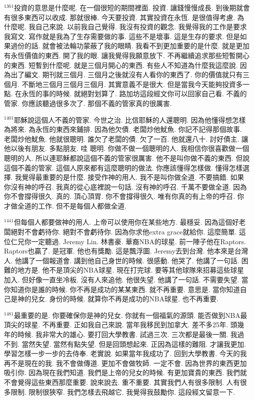 \documentclass{book}
\begin{document}
$^{1361}$投資的意思是什麼呢.
在一個很短的期間裡面.
投資.
讓錢慢慢成長.
到後期就會有很多東西可以收成.
那就很棒.
今天要投資.
其實投資在永恆.
是很值得考慮.
為什麼呢.
我自己來說.
以前我自己覺得.
我沒有投資的觀念.
我覺得我的工作是要求我寫文.
寫作就是我為了生存需要做的事.
這些不是壞事.
這是生存的要求.
但是如果過份的話.
就會被法輪功蒙蔽了我的眼睛.
我看不到更加重要的是什麼.
就是更加有永恆價值的東西.
開了我的眼.
讓我覺得我願意放下.
不再繼續追求那些短暫開心的東西.
短暫到什麼呢.
就是三個月開心的東西.
有些人不知道為什麼我這麼說.
因為出了編文.
期刊就三個月.
三個月之後就沒有人看你的東西了.
你的價值就只有三個月.
不斷地三個月三個月三個月.
其實意義不是很大.
但是當我今天能夠投資多一點.
在永恆的事的時候.
就絕對划算了.
路加坊這段經文你可以回家自己看.
不義的管家.
你應該聽過很多次了.
那個不義的管家真的很厲害.

$^{1401}$耶穌說這個人不義的管家.
今世之治.
比信耶穌的人還聰明.
因為他懂得想怎樣為將來.
為永恆的東西來鋪排.
因為他欠債.
老闆炒他魷魚.
你記不記得那個故事.
老闆炒他魷魚.
他就很聰明.
誰欠了老闆的債.
欠了一百.
他就還八十.
討好債主.
讓他以後有朋友.
多點朋友.
哇 聰明.
你做不做一個聰明的人.
我相信你很喜歡做一個聰明的人.
所以連耶穌都說這個不義的管家很厲害.
他不是叫你做不義的東西.
但說這個不義的管家.
這個人原來都有這麼聰明的做法.
你應該懂得怎樣做.
懂得怎樣選擇.
我覺得最重要的是什麼.
接受作神的用人.
我不是叫你做全道.
不要搞錯.
如果你沒有神的呼召.
我真的從心底裡說一句話.
沒有神的呼召.
千萬不要做全道.
因為你不會撐得很久.
真的.
頂心頂胃.
你不會撐得很久.
唯有你真的有上帝的呼召.
你才做全道的工作.
但不是每個人都做全道.

$^{1441}$但每個人都要做神的用人.
上帝可以使用你在某些地方.
最穩妥.
因為這個好老闆絕對不會虧待你.
絕對不會虧待你.
因為你求他extra grace就給你.
這麼簡單.
這位仁兄你一定聽過.
Jeremy Lin.
林書豪.
華裔NBA的球星.
前一陣子他在Raptors.
Raptors也贏了.
是冠軍.
他也有獎勵.
這是飄浮圖.
Jeremy去到台灣.
他本來是台灣人.
他講了一個報道會.
講到他自己身世的時候.
很感動.
他哭了.
他講了一句話.
困難的地方是.
他不是頂尖的NBA球星.
現在打完球.
要等其他球隊來招募這些球星加入.
但好像一直坐冷板.
沒有人來追他.
他很失望.
他講了一句話.
不需要失望.
當你知道你是誰的時候.
你不再是成功的某某東西.
就不再重要.
意思是.
當你知道自己是神的兒女.
身份的時候.
就算你不再是成功的NBA球星.
也不再重要.

$^{1481}$最重要的是.
你要確保你是神的兒女.
你就有一個福氣的源頭.
能否做到NBA最頂尖的球星.
不再重要.
正如我自己來說.
當年我移民到加拿大.
差不多25年.
頭幾年的時候.
我非常大的雄心.
要打回大學教書.
試過三次.
三次都是最後一關.
我過不到.
當然失望.
當然有點失望.
但是回頭想起來.
正因為這樣的難阻.
才讓我更加.
學習怎樣一步一步的去侍奉.
老實說.
如果當年我成功了.
回到大學教書.
今天的我再不是現在的我.
我不會做傳道.
更加不會做牧師.
一定不會.
因為世界的東西更加吸引你.
因為現在我們知道.
我們是上帝的兒女的時候.
有更加寶貴的東西.
我們就不會覺得這些東西那麼重要.
說來說去.
重不重要.
其實我們人有很多限制.
人有很多限制.
限制很狹窄.
我們怎樣去飛越它.
我覺得我鼓勵你.
這段經文留意一下.
\end{document}
